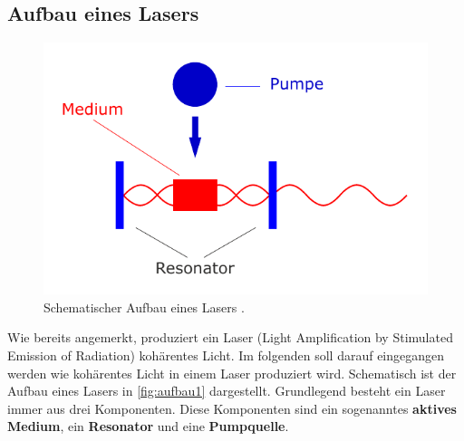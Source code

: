 \subsection{Aufbau eines Lasers}
\label{sec:aufbau1} 
\begin{figure}
    \centering
    \includegraphics[width = 0.7 \linewidth]{pictures/aufbau1.pdf}
    \caption{Schematischer Aufbau eines Lasers \cite{leifilaser}.}
    \label{fig:aufbau1}
\end{figure}
Wie bereits angemerkt, produziert ein Laser (Light Amplification by Stimulated Emission of Radiation) kohärentes Licht.
Im folgenden soll darauf eingegangen werden wie kohärentes Licht in einem Laser produziert wird.
Schematisch ist der Aufbau eines Lasers in \autoref{fig:aufbau1} dargestellt.
Grundlegend besteht ein Laser immer aus drei Komponenten.
Diese Komponenten sind ein sogenanntes \textbf{aktives Medium}, ein \textbf{Resonator} und eine \textbf{Pumpquelle}.
